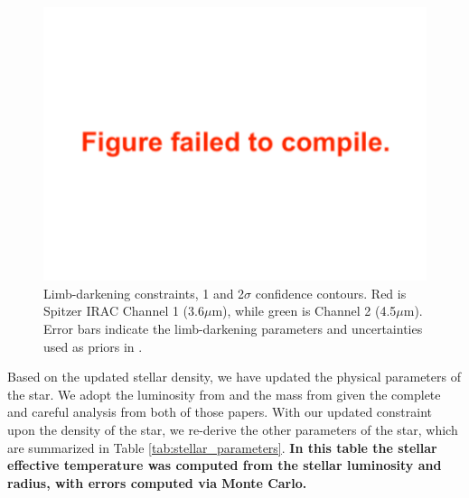 \documentclass[twocolumn]{aastex63}
\begin{document}
\begin{figure}
    \centering
    \includegraphics[width=\hsize]{figures/limb_darkening_nouprior.pdf}
    {Limb-darkening constraints, 1 and 2$\sigma$ confidence contours.  Red is Spitzer IRAC Channel 1 (3.6$\mu$m), while green is Channel 2 (4.5$\mu$m).  Error bars indicate the limb-darkening parameters and uncertainties used as priors in \citet{Ducrot2020}}.
    \label{fig:limb_darkening}
\end{figure}

Based on the updated stellar density, we have updated the physical
parameters of the star.  We adopt the luminosity from \citet{Ducrot2020}
and the mass from \citet{Mann2019} given the complete and careful analysis
from both of those papers.  With our updated constraint upon the density
of the star, we re-derive the other parameters of the star, which are summarized in Table \ref{tab:stellar_parameters}.
\textbf{In this table the stellar effective temperature was computed from
the stellar luminosity and radius, with errors computed via Monte Carlo.}
\end{document}
